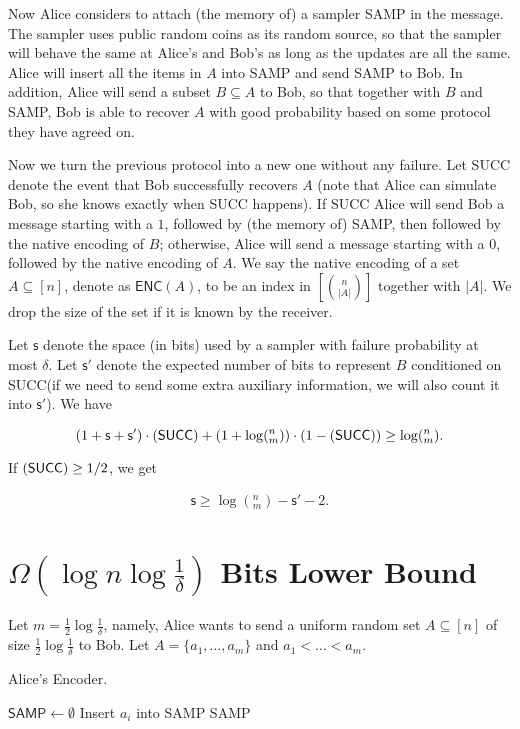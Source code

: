 \documentclass[10pt]{article}
\let\Pr\relax
\DeclareMathOperator*{\Pr}{\mathbb{P}}
\newcommand{\samp}{\textsf{SAMP}\xspace}
\newcommand{\success}{\textsf{SUCC}\xspace}
\newcommand{\enc}{\textsf{ENC}\xspace}
\newcommand{\s}{\textsf{s}\xspace}
\begin{document}
Now Alice considers to attach (the memory of) a sampler \samp in the message. The sampler uses public random coins as its random source, so that the sampler will behave the same at Alice's and Bob's as long as the updates are all the same. Alice will insert all the items in $A$ into \samp and send \samp to Bob. In addition, Alice will send a subset $B\subseteq A$ to Bob, so that together with $B$ and \samp, Bob is able to recover $A$ with good probability based on some protocol they have agreed on. 
 
Now we turn the previous protocol into a new one without any failure. Let \success denote the event that Bob successfully recovers $A$ (note that Alice can simulate Bob, so she knows exactly when \success happens). If \success Alice will send Bob a message starting with a $1$, followed by (the memory of) \samp, then followed by the native encoding of $B$; otherwise, Alice will send a message starting with a $0$, followed by the native encoding of $A$. We say the native encoding of a set $A\subseteq [n]$, denote as $\enc(A)$, to be an index in $[{n \choose |A|}]$ together with $|A|$. We drop the size of the set if it is known by the receiver.

Let $\s$ denote the space (in bits) used by a sampler with failure probability at most $\delta$. Let $\s'$ denote the expected number of bits to represent $B$ conditioned on \success (if we need to send some extra auxiliary information, we will also count it into $\s'$). We have 

$$(1+\s+\s')\cdot \Pr(\success)+(1+\log (^n_m)) \cdot (1-\Pr(\success)) \ge \log (^n_m).$$

If $\Pr(\success)\ge 1/2$, we get 

\begin{align} \label{formula:lb-meta}
\s\ge \log (^n_m) - \s' - 2.
\end{align}

\section{$\Omega(\log n \log {\frac{1}{\delta}})$ Bits Lower Bound}
Let $m=\frac{1}{2}\log \frac{1}{\delta}$, namely, Alice wants to send a uniform random set $A\subseteq [n]$ of size $\frac{1}{2}\log\frac{1}{\delta}$ to Bob. Let $A=\{a_1,\ldots,a_m\}$ and $a_1<\ldots<a_m$. 

\begin{algorithm}[H]
\caption{Alice's Encoder.}
\begin{algorithmic}[1]
\Procedure{$\enc_1$}{$A$}
  \State $\samp \leftarrow \emptyset$
    \State Insert $a_i$ into \samp
  \EndFor
  \State \Return \samp 
\EndProcedure
\end{algorithmic}
\end{algorithm}
\end{document}
